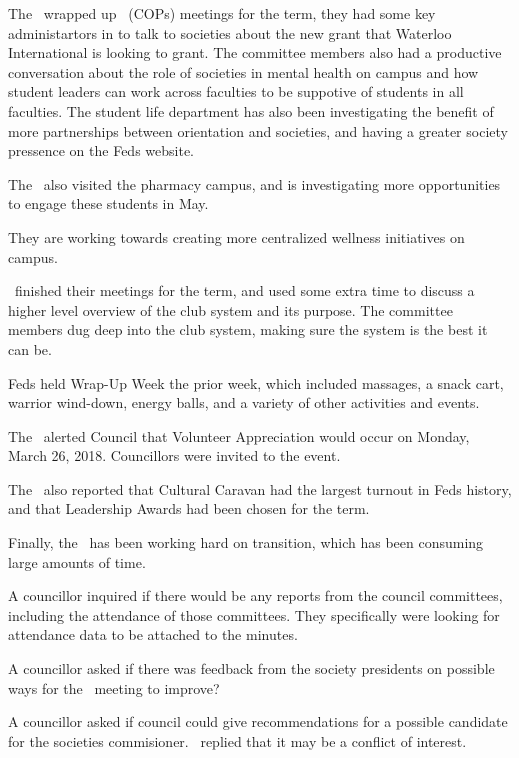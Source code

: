 \begin{information}

    The \vpi\ wrapped up \cops\ (COPs) meetings for the term, they had some key
    administartors in to talk to societies about the new grant that Waterloo 
    International is looking to grant. The committee members also had a 
    productive conversation about the role of societies in mental health on
    campus and how student leaders can work across faculties to be suppotive of
    students in all faculties. The student life department has also been 
    investigating the benefit of more partnerships between orientation and 
    societies, and having a greater society pressence on the Feds website.

    The \vpi\ also visited the pharmacy campus, and is investigating more
    opportunities to engage these students in May.

    They are working towards creating more centralized wellness initiatives on 
    campus.

    \iac\ finished their meetings for the term, and used some extra time to 
    discuss a higher level overview of the club system and its purpose. The 
    committee members dug deep into the club system, making sure the system is 
    the best it can be.

    Feds held Wrap-Up Week the prior week, which included massages, a snack
    cart, warrior wind-down, energy balls, and a variety of other activities
    and events.

    The \vpi\ alerted Council that Volunteer Appreciation would occur on 
    Monday, March 26, 2018. Councillors were invited to the event.

    The \vpi\ also reported that Cultural Caravan had the largest turnout in 
    Feds history, and that Leadership Awards had been chosen for the term.

    Finally, the \vpi\ has been working hard on transition, which has been 
    consuming large amounts of time.

    A councillor inquired if there would be any reports from the council 
    committees, including the attendance of those committees. They specifically
    were looking for attendance data to be attached to the minutes.

    A councillor asked if there was feedback from the society presidents on 
    possible ways for the \cops\ meeting to improve?

    A councillor asked if council could give recommendations for a possible
    candidate for the societies commisioner. \vpi\ replied that it may be a
    conflict of interest.

\end{information}

